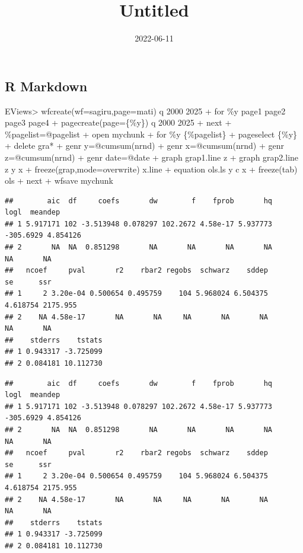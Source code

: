 \documentclass[
]{article}
\title{Untitled}
\author{}
\date{\vspace{-2.5em}2022-06-11}
\newenvironment{Shaded}{\begin{snugshade}}{\end{snugshade}}
\newcommand{\NormalTok}[1]{#1}
\begin{document}
\maketitle

{
\setcounter{tocdepth}{2}
\tableofcontents
}
\hypertarget{r-markdown}{%
\subsection{R Markdown}\label{r-markdown}}

\begin{Shaded}
\begin{Highlighting}[]
\NormalTok{EViews\textgreater{} wfcreate(wf=sagiru,page=mati) q 2000 2025}
\NormalTok{+ for \%y page1 page2 page3 page4}
\NormalTok{+ pagecreate(page=\{\%y\}) q 2000 2025}
\NormalTok{+ next}
\NormalTok{+ \%pagelist=@pagelist}
\NormalTok{+ \textquotesingle{}open mychunk}
\NormalTok{+ for \%y \{\%pagelist\}}
\NormalTok{+ pageselect \{\%y\}}
\NormalTok{+ delete gra*}
\NormalTok{+ genr y=@cumsum(nrnd)}
\NormalTok{+ genr x=@cumsum(nrnd)}
\NormalTok{+ genr z=@cumsum(nrnd)}
\NormalTok{+ genr date=@date}
\NormalTok{+                      graph grap1.line z  }
\NormalTok{+                            graph grap2.line z y x}
\NormalTok{+    freeze(grap,mode=overwrite) x.line}
\NormalTok{+ equation ols.ls y c x}
\NormalTok{+ freeze(tab) ols}
\NormalTok{+ next}
\NormalTok{+ wfsave mychunk}
\end{Highlighting}
\end{Shaded}

\begin{verbatim}
##        aic  df     coefs       dw        f    fprob       hq      logl  meandep
## 1 5.917171 102 -3.513948 0.078297 102.2672 4.58e-17 5.937773 -305.6929 4.854126
## 2       NA  NA  0.851298       NA       NA       NA       NA        NA       NA
##   ncoef     pval       r2    rbar2 regobs  schwarz    sddep       se      ssr
## 1     2 3.20e-04 0.500654 0.495759    104 5.968024 6.504375 4.618754 2175.955
## 2    NA 4.58e-17       NA       NA     NA       NA       NA       NA       NA
##    stderrs    tstats
## 1 0.943317 -3.725099
## 2 0.084181 10.112730
\end{verbatim}

\begin{verbatim}
##        aic  df     coefs       dw        f    fprob       hq      logl  meandep
## 1 5.917171 102 -3.513948 0.078297 102.2672 4.58e-17 5.937773 -305.6929 4.854126
## 2       NA  NA  0.851298       NA       NA       NA       NA        NA       NA
##   ncoef     pval       r2    rbar2 regobs  schwarz    sddep       se      ssr
## 1     2 3.20e-04 0.500654 0.495759    104 5.968024 6.504375 4.618754 2175.955
## 2    NA 4.58e-17       NA       NA     NA       NA       NA       NA       NA
##    stderrs    tstats
## 1 0.943317 -3.725099
## 2 0.084181 10.112730
\end{verbatim}
\end{document}
